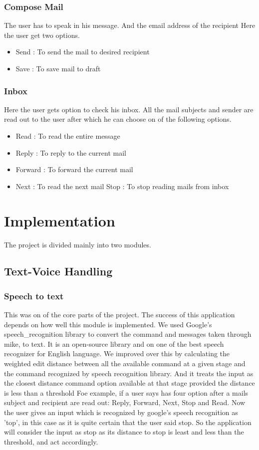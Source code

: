 \documentclass[12pt]{article}
\begin{document}
\subsubsection{Compose Mail}
The user has to speak in his message. And the email address of the recipient
Here the user get two options. \begin{itemize}
    \item Send : To send the mail to desired recipient
    \item Save : To save mail to draft
\end{itemize}

\subsubsection{Inbox}
Here the user gets option to check his inbox. All the mail subjects and sender are read out to the user after which he can choose on of the following options. \begin{itemize}
    \item Read : To read the entire message
    \item Reply : To reply to the current mail
    \item Forward : To forward the current mail
    \item Next : To read the next mail
    \iteam Stop : To stop reading mails from inbox
\end{itemize}

\section{Implementation}
The project is divided mainly into two modules.
\subsection{Text-Voice Handling}
\subsubsection{Speech to text}
This was on of the core parts of the project. The success of this application depends on how well this module is implemented. We used Google's speech\_recognition library to convert the command and messages taken through mike, to text. It is an open-source library and on one of the best speech recognizer for English language.\newline
We improved over this by calculating the weighted edit distance between all the available command at a given stage and the command recognized by speech recognition library. And it treats the input as the closest distance command option available at that stage provided the distance is less than a threshold \newline
Foe example, if a user says has four option after a mails subject and recipient are read out: Reply, Forward, Next, Stop and Read. Now the user gives an input which is recognized by google's speech recognition as 'top', in this case as it is quite certain that the user said stop. So the application will consider the input as stop as its distance to stop is least and less than the threshold, and act accordingly.
\end{document}
